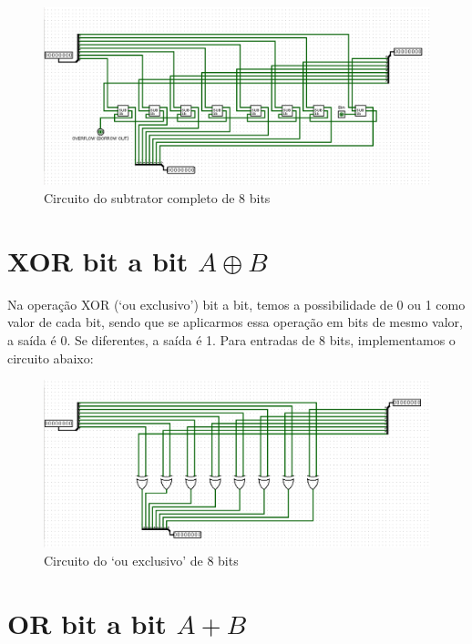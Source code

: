 \documentclass[
	12pt,				%
	openright,			%
	twoside,			%
	a4paper,			%
	english,			%
	french,				%
	spanish,			%
	brazil,				%
	]{abntex2}
\begin{document}
\begin{figure}[H]
	\begin{center}
        \includegraphics[scale=0.4]{imagens/subtrator8b.png}
	\end{center}
\caption{\label{subtrator8b}Circuito do subtrator completo de 8 bits}
\end{figure}

\section{XOR bit a bit \texorpdfstring{$A \oplus B$}{Lg}}
Na operação XOR (‘ou exclusivo’) bit a bit, temos a possibilidade de 0 ou 1 como valor de cada bit, sendo que se aplicarmos essa operação em bits de mesmo valor, a saída é 0. Se diferentes, a saída é 1. Para entradas de 8 bits, implementamos o circuito abaixo:

\begin{figure}[H]
	\begin{center}
	    \includegraphics[scale=0.4]{imagens/xor8b.png}
	\end{center}
\caption{\label{xor}Circuito do ‘ou exclusivo’ de 8 bits}
\end{figure}

\section{OR bit a bit \texorpdfstring{$A+B$}{Lg}}
\end{document}
